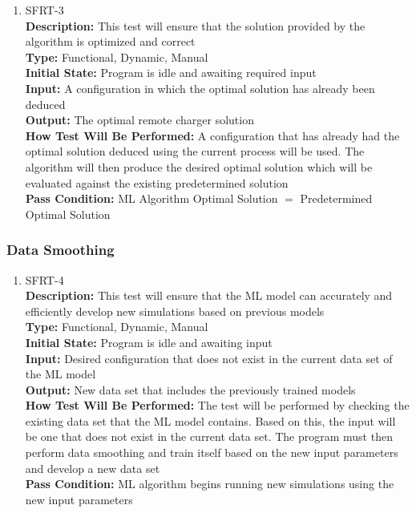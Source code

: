 \documentclass[12pt, titlepage]{article}
\begin{document}
\begin{enumerate}
    \item{SFRT-3\\}
    \textbf{Description:} This test will ensure that the solution provided by the algorithm is optimized and correct\\
    \textbf{Type:} Functional, Dynamic, Manual\\
    \textbf{Initial State:} Program is idle and awaiting required input\\
    \textbf{Input:} A configuration in which the optimal solution has already been deduced\\
    \textbf{Output:} The optimal remote charger solution\\
    \textbf{How Test Will Be Performed:} A configuration that has already had the optimal solution deduced using the current process will be used. The algorithm will then produce the desired optimal solution which will be evaluated against the existing predetermined solution\\
    \textbf{Pass Condition:} ML Algorithm Optimal Solution $=$ Predetermined Optimal Solution\\
\end{enumerate}

\subsubsection{Data Smoothing}
\begin{enumerate}
    \item{SFRT-4\\}
    \textbf{Description:} This test will ensure that the ML model can accurately and efficiently develop new simulations based on previous models\\
    \textbf{Type:} Functional, Dynamic, Manual\\
    \textbf{Initial State:} Program is idle and awaiting input\\
    \textbf{Input:} Desired configuration that does not exist in the current data set of the ML model\\
    \textbf{Output:} New data set that includes the previously trained models\\
    \textbf{How Test Will Be Performed:} The test will be performed by checking the existing data set that the ML model contains. Based on this, the input will be one that does not exist in the current data set. The program must then perform data smoothing and train itself based on the new input parameters and develop a new data set\\
    \textbf{Pass Condition:} ML algorithm begins running new simulations using the new input parameters\\
\end{enumerate}
\end{document}
